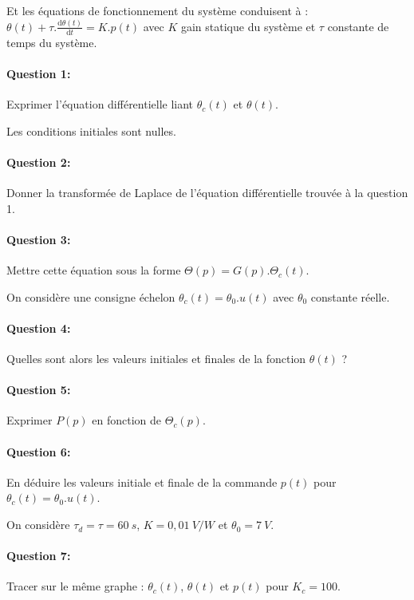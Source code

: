 Et les équations de fonctionnement du système conduisent à :
$\theta(t)+\tau.\frac{\mathrm{d}\theta(t)}{\mathrm{d}t}=K.p(t)$
avec $K$ gain statique du système et $\tau$ constante de temps du système.

\paragraph{Question 1:} Exprimer l'équation différentielle liant $\theta_c(t)$ et $\theta(t)$.

Les conditions initiales sont nulles.

\paragraph{Question 2:} Donner la transformée de Laplace de l'équation différentielle trouvée à la question 1.

\paragraph{Question 3:} Mettre cette équation sous la forme $\Theta(p)=G(p).\Theta_c(t)$.

On considère une consigne échelon $\theta_c(t)=\theta_0.u(t)$ avec $\theta_0$ constante réelle. 

\paragraph{Question 4:} Quelles sont alors les valeurs initiales et finales de la fonction $\theta(t)$ ?

\paragraph{Question 5:} Exprimer $P(p)$ en fonction de $\Theta_c(p)$.

\paragraph{Question 6:} En déduire les valeurs initiale et finale de la commande $p(t)$ pour $\theta_c(t)=\theta_0.u(t)$.

On considère $\tau_d=\tau=60\ s$, $K=0,01\ V/W$ et $\theta_0=7\ V$.

\paragraph{Question 7:} Tracer sur le même graphe : $\theta_c(t)$, $\theta(t)$ et $p(t)$ pour $K_c=100$.
